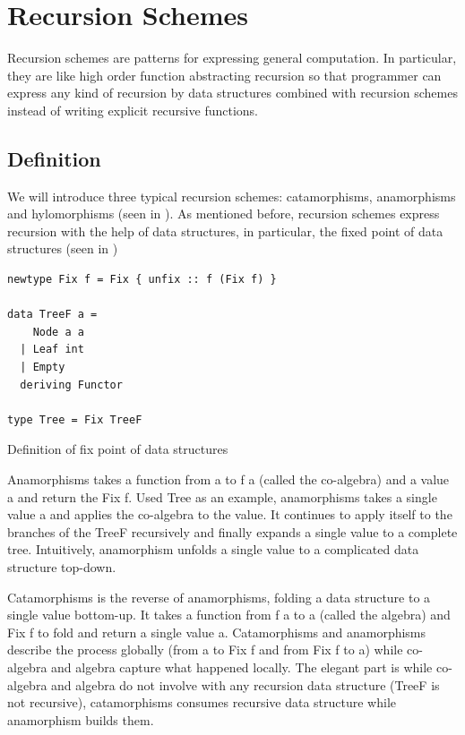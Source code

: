 \section{Recursion Schemes} \label{b:rs}
Recursion schemes are patterns for expressing general computation. In particular, they are like high order function abstracting recursion so that programmer can express any kind of recursion by data structures combined with recursion schemes instead of writing explicit recursive functions.
\subsection{Definition}
We will introduce three typical recursion schemes: catamorphisms, anamorphisms and hylomorphisms (seen in ). As mentioned before, recursion schemes express recursion with the help of data structures, in particular, the fixed point of data structures (seen in )
\begin{code}
\begin{verbatim}
newtype Fix f = Fix { unfix :: f (Fix f) }

data TreeF a =
    Node a a
  | Leaf int
  | Empty
  deriving Functor

type Tree = Fix TreeF
\end{verbatim}
\caption{Definition of fix point of data structures} \label{p:pal:c2}
\end{code}

Anamorphisms takes a function from a to f a (called the co-algebra) and a value a and return the Fix f. Used Tree as an example, anamorphisms takes a single value a and applies the co-algebra to the value. It continues to apply itself to the branches of the TreeF recursively and finally expands a single value to a complete tree. Intuitively, anamorphism unfolds a single value to a complicated data structure top-down.

Catamorphisms is the reverse of anamorphisms, folding a data structure to a single value bottom-up. It takes a function from f a to a (called the algebra) and Fix f to fold and return a single value a. Catamorphisms and anamorphisms describe the process globally (from a to Fix f and from Fix f to a) while co-algebra and algebra capture what happened locally. The elegant part is while co-algebra and algebra do not involve with any recursion data structure (TreeF is not recursive), catamorphisms consumes recursive data structure while anamorphism builds them.

